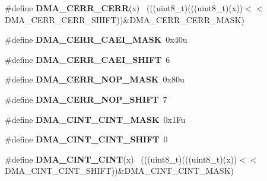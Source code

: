 \begin{DoxyCompactItemize}
\item 
\hypertarget{group___d_m_a___register___masks_ga3e085a0f5207f30cff9282443122c2b0}{}\#define {\bfseries D\+M\+A\+\_\+\+C\+E\+R\+R\+\_\+\+C\+E\+R\+R}(x)                                              ~(((uint8\+\_\+t)(((uint8\+\_\+t)(x))$<$$<$D\+M\+A\+\_\+\+C\+E\+R\+R\+\_\+\+C\+E\+R\+R\+\_\+\+S\+H\+I\+F\+T))\&D\+M\+A\+\_\+\+C\+E\+R\+R\+\_\+\+C\+E\+R\+R\+\_\+\+M\+A\+S\+K)\label{group___d_m_a___register___masks_ga3e085a0f5207f30cff9282443122c2b0}

\item 
\hypertarget{group___d_m_a___register___masks_ga7998031f3e0e7906d352da54eb92a1a8}{}\#define {\bfseries D\+M\+A\+\_\+\+C\+E\+R\+R\+\_\+\+C\+A\+E\+I\+\_\+\+M\+A\+S\+K}~0x40u\label{group___d_m_a___register___masks_ga7998031f3e0e7906d352da54eb92a1a8}

\item 
\hypertarget{group___d_m_a___register___masks_ga04db9fa5c262642ad17f27d1cad24fba}{}\#define {\bfseries D\+M\+A\+\_\+\+C\+E\+R\+R\+\_\+\+C\+A\+E\+I\+\_\+\+S\+H\+I\+F\+T}~6\label{group___d_m_a___register___masks_ga04db9fa5c262642ad17f27d1cad24fba}

\item 
\hypertarget{group___d_m_a___register___masks_gac284972d1fac094dd241e268d7a0ee17}{}\#define {\bfseries D\+M\+A\+\_\+\+C\+E\+R\+R\+\_\+\+N\+O\+P\+\_\+\+M\+A\+S\+K}~0x80u\label{group___d_m_a___register___masks_gac284972d1fac094dd241e268d7a0ee17}

\item 
\hypertarget{group___d_m_a___register___masks_ga06ff2ec2da47380a89fcd01777bbe400}{}\#define {\bfseries D\+M\+A\+\_\+\+C\+E\+R\+R\+\_\+\+N\+O\+P\+\_\+\+S\+H\+I\+F\+T}~7\label{group___d_m_a___register___masks_ga06ff2ec2da47380a89fcd01777bbe400}

\item 
\hypertarget{group___d_m_a___register___masks_ga1edbbba2f0260e0467e0a43e04eaaa1d}{}\#define {\bfseries D\+M\+A\+\_\+\+C\+I\+N\+T\+\_\+\+C\+I\+N\+T\+\_\+\+M\+A\+S\+K}~0x1\+Fu\label{group___d_m_a___register___masks_ga1edbbba2f0260e0467e0a43e04eaaa1d}

\item 
\hypertarget{group___d_m_a___register___masks_ga5fd76123ada3ca8b762c83b344994a78}{}\#define {\bfseries D\+M\+A\+\_\+\+C\+I\+N\+T\+\_\+\+C\+I\+N\+T\+\_\+\+S\+H\+I\+F\+T}~0\label{group___d_m_a___register___masks_ga5fd76123ada3ca8b762c83b344994a78}

\item 
\hypertarget{group___d_m_a___register___masks_ga01c80d09fd8825bb2f3bbd68073928b2}{}\#define {\bfseries D\+M\+A\+\_\+\+C\+I\+N\+T\+\_\+\+C\+I\+N\+T}(x)                                              ~(((uint8\+\_\+t)(((uint8\+\_\+t)(x))$<$$<$D\+M\+A\+\_\+\+C\+I\+N\+T\+\_\+\+C\+I\+N\+T\+\_\+\+S\+H\+I\+F\+T))\&D\+M\+A\+\_\+\+C\+I\+N\+T\+\_\+\+C\+I\+N\+T\+\_\+\+M\+A\+S\+K)\label{group___d_m_a___register___masks_ga01c80d09fd8825bb2f3bbd68073928b2}


\end{DoxyCompactItemize}
